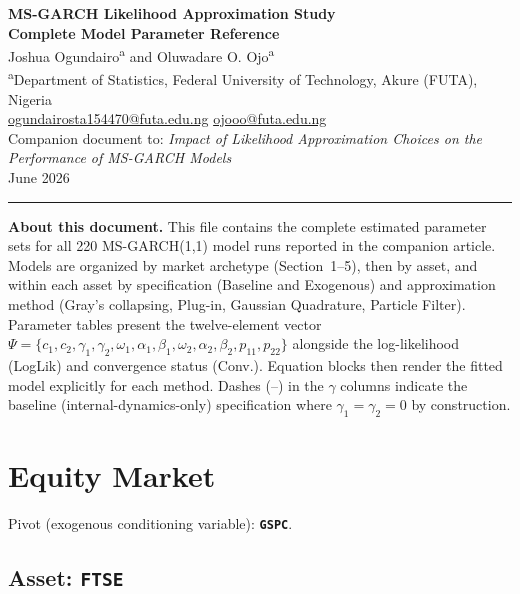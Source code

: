 \documentclass[11pt, a4paper]{article}
\begin{document}
\begin{center}
{\LARGE \bfseries MS-GARCH Likelihood Approximation Study}\\[0.6em]
{\large \bfseries Complete Model Parameter Reference}\\[1em]
{\large Joshua Ogundairo\textsuperscript{a} \quad and \quad Oluwadare O. Ojo\textsuperscript{a}}\\[0.4em]
{\small \textsuperscript{a}Department of Statistics, Federal University of Technology, Akure (FUTA), Nigeria}\\[0.2em]
{\small \href{mailto:ogundairosta154470@futa.edu.ng}{ogundairosta154470@futa.edu.ng} \quad \href{mailto:ojooo@futa.edu.ng}{ojooo@futa.edu.ng}}\\[0.6em]
{\small Companion document to: \textit{Impact of Likelihood Approximation Choices on the Performance of MS-GARCH Models}}\\[0.4em]
{\small June 2026}
\end{center}

\vspace{0.5em}\hrule\vspace{1em}

\noindent\textbf{About this document.}
This file contains the complete estimated parameter sets for all 220 MS-GARCH(1,1) model runs
reported in the companion article. Models are organized by market archetype (Section~1--5),
then by asset, and within each asset by specification (Baseline and Exogenous) and approximation
method (Gray's collapsing, Plug-in, Gaussian Quadrature, Particle Filter).
Parameter tables present the twelve-element vector
$\Psi = \{c_1, c_2, \gamma_1, \gamma_2, \omega_1, \alpha_1, \beta_1, \omega_2, \alpha_2, \beta_2, p_{11}, p_{22}\}$
alongside the log-likelihood (LogLik) and convergence status (Conv.).
Equation blocks then render the fitted model explicitly for each method.
Dashes (--) in the $\gamma$ columns indicate the baseline (internal-dynamics-only) specification
where $\gamma_1 = \gamma_2 = 0$ by construction.

\tableofcontents
\newpage

\section{Equity Market}
\noindent Pivot (exogenous conditioning variable): \textbf{\texttt{GSPC}}.

\subsection{Asset: \texttt{FTSE}}
\end{document}
